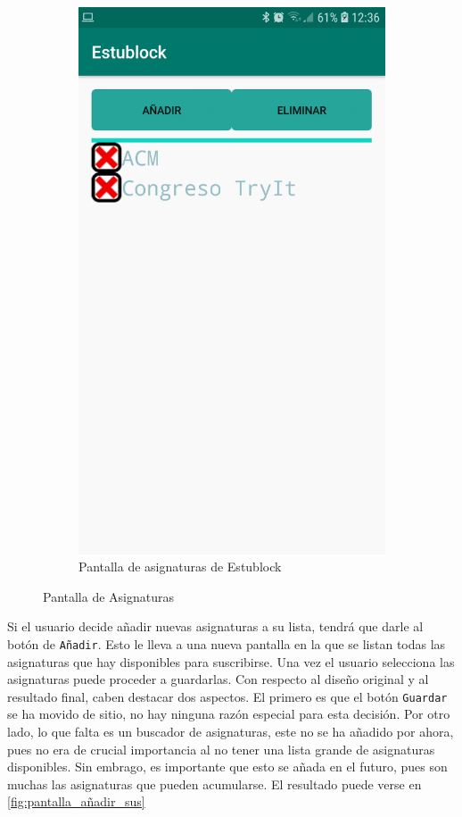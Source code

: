 \begin{figure}[hbt]
\begin{subfigure}[b]{0.4\linewidth}
        \includegraphics[width=0.7\linewidth]{figs/Desarrollo/Interfaz/estublock_asignaturas_suscritas}
        \caption[Estublock Asignaturas]{Pantalla de asignaturas de Estublock}
	\end{subfigure} 
	\caption[Pantalla de Asignaturas]{Pantalla de Asignaturas}
	\label{fig:pantalla_asignaturas}
\end{figure}

Si el usuario decide añadir nuevas asignaturas a su lista, tendrá que darle al botón de \verb|Añadir|. Esto le lleva a una nueva pantalla en la que se listan todas las asignaturas que hay disponibles para suscribirse. Una vez el usuario selecciona las asignaturas puede proceder a guardarlas. Con respecto al diseño original y al resultado final, caben destacar dos aspectos. El primero es que el botón \verb|Guardar| se ha movido de sitio, no hay ninguna razón especial para esta decisión. Por otro lado, lo que falta es un buscador de asignaturas, este no se ha añadido por ahora, pues no era de crucial importancia al no tener una lista grande de asignaturas disponibles. Sin embrago, es importante que esto se añada en el futuro, pues son muchas las asignaturas que pueden acumularse. El resultado puede verse en \ref{fig:pantalla_añadir_sus}

